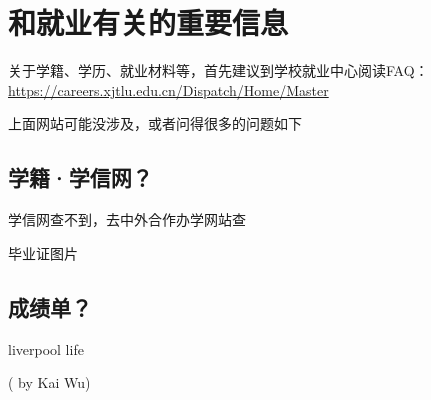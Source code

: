 \section{和就业有关的重要信息}

关于学籍、学历、就业材料等，首先建议到学校就业中心阅读FAQ：\url{https://careers.xjtlu.edu.cn/Dispatch/Home/Master}

上面网站可能没涉及，或者问得很多的问题如下

\subsection{学籍·学信网？}

学信网查不到，去中外合作办学网站查

毕业证图片

\subsection{成绩单？}

liverpool life



\begin{flushright}
( by Kai Wu)
\end{flushright}





% 

